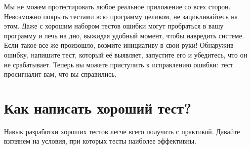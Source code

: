 \documentclass[a4paper,10pt,twoside]{book}
\begin{document}

Мы не можем протестировать любое реальное приложение со всех сторон.
Невозможно покрыть тестами всю программу целиком, не зацикливайтесь на этом.
Даже с хорошим набором тестов ошибки могут пробраться в вашу программу и лечь на дно, 
выжидая удобный момент, чтобы навредить системе.
Если такое все же произошло, возмите инициативу в свои руки!
Обнаружив ошибку, напишите тест, который её выявляет, запустите его и убедитесь, что он не срабатывает.
Теперь вы можете приступить к исправлению ошибки: тест просигналит вам, что вы справились.

\section{Как написать хороший тест?}

Навык разработки хороших тестов легче всего получить с практикой.
Давайте взглянем на условия, при которых тесты наиболее эффективны.
\end{document}
